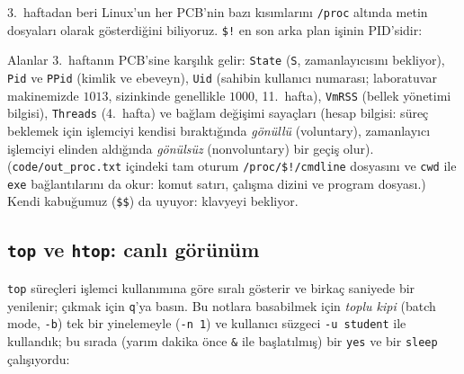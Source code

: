 \documentclass[11pt,a4paper]{article}
\newcommand{\cmd}[1]{\texttt{#1}}
\begin{document}
3.~haftadan beri Linux'un her PCB'nin bazı kısımlarını \texttt{/proc} altında metin dosyaları olarak gösterdiğini biliyoruz. \verb|$!| en son arka plan işinin PID'sidir:



Alanlar 3.~haftanın PCB'sine karşılık gelir: \texttt{State} (\texttt{S}, zamanlayıcısını bekliyor), \texttt{Pid} ve \texttt{PPid} (kimlik ve ebeveyn), \texttt{Uid} (sahibin kullanıcı numarası; laboratuvar makinemizde $1013$, sizinkinde genellikle $1000$, 11.~hafta), \texttt{VmRSS} (bellek yönetimi bilgisi), \texttt{Threads} (4.~hafta) ve bağlam değişimi sayaçları (hesap bilgisi: süreç beklemek için işlemciyi kendisi bıraktığında \emph{gönüllü} (voluntary), zamanlayıcı işlemciyi elinden aldığında \emph{gönülsüz} (nonvoluntary) bir geçiş olur). (\texttt{code/out\_proc.txt} içindeki tam oturum \texttt{/proc/\$!/cmdline} dosyasını ve \texttt{cwd} ile \texttt{exe} bağlantılarını da okur: komut satırı, çalışma dizini ve program dosyası.) Kendi kabuğumuz (\verb|$$|) da uyuyor: klavyeyi bekliyor.

\subsection{\texttt{top} ve \texttt{htop}: canlı görünüm}
\label{sec:top}

\cmd{top} süreçleri işlemci kullanımına göre sıralı gösterir ve birkaç saniyede bir yenilenir; çıkmak için \texttt{q}'ya basın. Bu notlara basabilmek için \emph{toplu kipi} (batch mode, \cmd{-b}) tek bir yinelemeyle (\cmd{-n 1}) ve kullanıcı süzgeci \cmd{-u student} ile kullandık; bu sırada (yarım dakika önce \texttt{\&} ile başlatılmış) bir \cmd{yes} ve bir \cmd{sleep} çalışıyordu:


\end{document}
